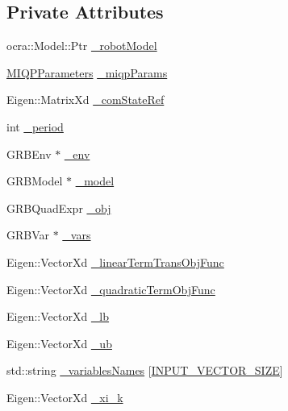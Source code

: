 \subsection*{\-Private \-Attributes}
\begin{DoxyCompactItemize}
\item 
ocra\-::\-Model\-::\-Ptr \hyperlink{classMIQPController_a03735ecec3242cdfc9bf8a443c561724}{\-\_\-robot\-Model}
\item 
\hyperlink{structMIQPParameters}{\-M\-I\-Q\-P\-Parameters} \hyperlink{classMIQPController_a23f6caec48541df0ebe3f91189171ce5}{\-\_\-miqp\-Params}
\item 
\-Eigen\-::\-Matrix\-Xd \hyperlink{classMIQPController_ab74859a8dd208f3fc7608391d318d469}{\-\_\-com\-State\-Ref}
\item 
int \hyperlink{classMIQPController_aed2ce53008e32e64e107398d85e75170}{\-\_\-period}
\item 
\-G\-R\-B\-Env $\ast$ \hyperlink{classMIQPController_aec530057d97a52549fdc3823a48f73cf}{\-\_\-env}
\item 
\-G\-R\-B\-Model $\ast$ \hyperlink{classMIQPController_a2bafe24633a7f8c9d6211cde12b29a90}{\-\_\-model}
\item 
\-G\-R\-B\-Quad\-Expr \hyperlink{classMIQPController_a4bac1e68bd433553a7c00677bdc496dd}{\-\_\-obj}
\item 
\-G\-R\-B\-Var $\ast$ \hyperlink{classMIQPController_a1143bf95d61a348b08010c909b190029}{\-\_\-vars}
\item 
\-Eigen\-::\-Vector\-Xd \hyperlink{classMIQPController_ac2ec0c5287589fe28f7381ebeaa5f4ef}{\-\_\-linear\-Term\-Trans\-Obj\-Func}
\item 
\-Eigen\-::\-Vector\-Xd \hyperlink{classMIQPController_a532459bb659a1cc39d449fdf3f81c63f}{\-\_\-quadratic\-Term\-Obj\-Func}
\item 
\-Eigen\-::\-Vector\-Xd \hyperlink{classMIQPController_ad3544c00f3515146c1818440905e36cc}{\-\_\-lb}
\item 
\-Eigen\-::\-Vector\-Xd \hyperlink{classMIQPController_aa8407451ad8b20c814b12fef631f43f6}{\-\_\-ub}
\item 
std\-::string \hyperlink{classMIQPController_a2c3ddd93fd843a3a4650314b47436be7}{\-\_\-variables\-Names} \mbox{[}\hyperlink{MIQPController_8h_aa2f26540ce870ca91503bb6746a52e69}{\-I\-N\-P\-U\-T\-\_\-\-V\-E\-C\-T\-O\-R\-\_\-\-S\-I\-Z\-E}\mbox{]}
\item 
\-Eigen\-::\-Vector\-Xd \hyperlink{classMIQPController_ad1c63725dab2ce84382fcb0b071325ed}{\-\_\-xi\-\_\-k}
\item 

\end{DoxyCompactItemize}
